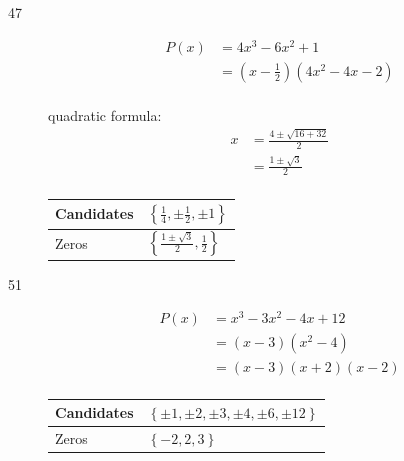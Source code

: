 \documentclass{exam}
\begin{document}
\begin{description}
        \vspace{.5 cm}

      \item[47] 
        \begin{align*}
          P(x) &= 4x^3 - 6x^2 + 1 \\
               &= \left( x - \frac{1}{2} \right)(4x^2 - 4x - 2) \\
        \end{align*}
        
        quadratic formula:
        \begin{align*}
          x &= \frac{4 \pm \sqrt{16 + 32}}{2} \\
            &= \frac{1 \pm \sqrt{3}}{2} \\
        \end{align*}

        \begin{tabular}{ll}
          \toprule
          Candidates & $\left\{ \frac{1}{4}, \pm \frac{1}{2}, \pm 1 \right\}$ \\
          \midrule
          Zeros      & $\left\{ \frac{1 \pm \sqrt{3}}{2}, \frac{1}{2} \right\}$ \\
          \bottomrule
        \end{tabular}

        \vspace{.5 cm}

    \pagebreak

      \item[51] 
        \begin{align*}
          P(x) &= x^3 - 3x^2 - 4x + 12 \\
               &= (x - 3)(x^2 - 4) \\
               &= (x - 3)(x + 2)(x - 2) \\
        \end{align*}
        
        \begin{tabular}{ll}
          \toprule
          Candidates & $\left\{ \pm 1,\pm 2,\pm 3,\pm 4,\pm 6,\pm 12 \right\}$ \\
          \midrule
          Zeros      & $\left\{ -2, 2, 3 \right\}$ \\
          \bottomrule
        \end{tabular}


\end{description}
\end{document}
